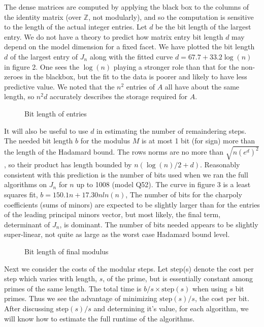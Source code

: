 \documentclass{acm_proc_article-sp}
\def\Z{\mathbb Z}
\newcommand{\step}{\ensuremath{\mbox{step}}}
\begin{document}
The dense matrices are computed by applying the black box to the columns of the 
identity matrix (over $\Z$, not modularly), and so the computation is 
sensitive to the length of the 
actual integer entries.
Let $d$ be the bit length of the 
largest entry.  
We do not have a theory to predict how matrix entry bit length $d$ may depend on the 
model dimension for a fixed facet. 
We have plotted the bit length $d$ of the largest entry of $J_n$ along with
the fitted curve $d = 67.7 + 33.2\log(n)$ in figure 2.  
One sees the $\log(n)$ playing a stronger role than that for the non-zeroes in the blackbox,
but the fit to the data is poorer and likely to have less predictive value.
We noted that the $n^2$ entries of $A$ all have about the same length, so $n^2 d$ accurately
describes the storage required for $A$.
\begin{figure}[h] %
\caption{Bit length of entries}
\end{figure}

It will also be useful to use $d$ in estimating the number of remaindering steps.
The needed bit length $b$ for the modulus $M$ is at most 1 bit (for sign) more 
than the length of the Hadamard bound.  The rows norms are no more than \(\sqrt{n(e^d)^2}\),
so their product has length bounded by $n(\log(n)/2 + d)$.
Reasonably consistent with this prediction is the number of bits used when we ran
the full algorithms on $J_n$ for $n$ up to 1008 (model Q52).  
The curve in figure 3 is a least squares fit,
$b = 150.1 n + 17.30n ln(n)$,
The number of bits for the charpoly coefficients (sums of minors) are expected 
to be slightly larger than for the entries of the  leading principal minors vector,
but most likely, the final term, determinant of $J_n$, is dominant.  
The number of bits needed appears to be slightly super-linear, not quite as large as
the worst case Hadamard bound level.  
\begin{figure}[h] %
\caption{Bit length of final modulus}
\end{figure}

Next we consider the costs of the modular steps.
Let \step(s) denote the cost per step which varies with length, $s$, of the prime, 
but is essentially constant among primes of the same length.
The total time  is $b/s \times \step(s)$ when using $s$ bit primes. 
Thus we see the advantage of minimizing $\step(s)/s$, the cost per bit.
After discussing $\step(s)/s$ and determining it's value, for each algorithm,  
we will know how to estimate the full runtime of the algorithms.
\end{document}
